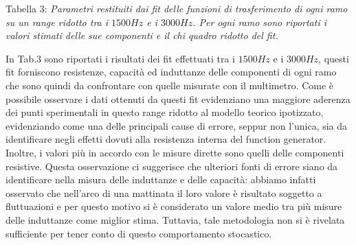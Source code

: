 \documentclass[]{article}
\begin{document}
\begin{center}
	Tabella 3: \emph{Parametri restituiti dai fit delle funzioni di trasferimento di ogni ramo su un range ridotto tra i $1500Hz$ e i $3000Hz$. Per ogni ramo sono riportati i valori stimati delle sue componenti e il chi quadro ridotto del fit.}
\end{center}

In Tab.3 sono riportati i risultati dei fit effettuati tra i $1500Hz$ e i $3000Hz$, questi fit forniscono resistenze, capacità ed induttanze delle componenti di ogni ramo che sono quindi da confrontare con quelle misurate con il multimetro.  
Come è possibile osservare i dati ottenuti da questi fit evidenziano una maggiore aderenza dei punti sperimentali in questo range ridotto al modello teorico ipotizzato, evidenziando come una delle principali cause di errore, seppur non l'unica, sia da identificare negli effetti dovuti alla resistenza interna del function generator. \\
Inoltre, i valori più in accordo con le misure dirette sono quelli delle componenti resistive. Questa osservazione ci suggerisce che ulteriori fonti di errore siano da identificare nella misura delle induttanze e delle capacità: abbiamo infatti osservato che nell'arco di una mattinata il loro valore è risultato soggetto a fluttuazioni e per questo motivo si è considerato un valore medio tra più misure delle induttanze come miglior stima. Tuttavia, tale metodologia non si è rivelata sufficiente per tener conto di questo comportamento stocastico.  
\end{document}
